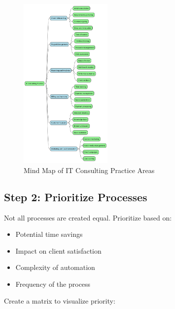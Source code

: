 \begin{figure}[h]
    \centering
    \includegraphics[width=0.40\textwidth]{./figures/04-consulting_practice_mindmap}
    \caption{Mind Map of IT Consulting Practice Areas}
    \label{fig:consulting_mindmap}
\end{figure}

\subsection{Step 2: Prioritize Processes}

Not all processes are created equal. Prioritize based on:
\begin{itemize}
    \item Potential time savings
    \item Impact on client satisfaction
    \item Complexity of automation
    \item Frequency of the process
\end{itemize}

Create a matrix to visualize priority:

